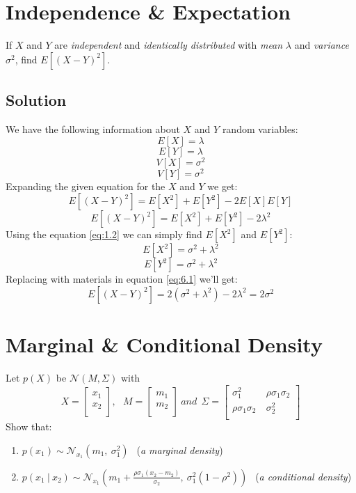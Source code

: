 \documentclass[12pt]{article}
\numberwithin{equation}{section}
\numberwithin{table}{section}
\numberwithin{figure}{section}
\begin{document}
\section{Independence \& Expectation}
If $X$ and $Y$ are \textit{independent} and \textit{identically distributed} with \textit{mean} $\lambda$ and \textit{variance} $\sigma^2$, find $E[(X-Y)^2]$.

\subsection*{Solution}
We have the following information about $X$ and $Y$ random variables:\\
$$
	E[X] = \lambda
$$
$$
	E[Y] = \lambda
$$
$$
	V[X] = \sigma^2
$$
$$
	V[Y] = \sigma^2
$$
Expanding the given equation for the $X$ and $Y$ we get:
$$
	E[(X-Y)^2] = E[X^2] + E[Y^2] - 2E[X]E[Y]
$$	
\begin{equation}\label{eq:6.1}
E[(X-Y)^2] = E[X^2] + E[Y^2] - 2\lambda^2
\end{equation}
Using the equation \ref{eq:1.2} we can simply find $E[X^2]$ and $E[Y^2]$:
$$
	E[X^2] = \sigma^2 + \lambda^2
$$
$$
	E[Y^2] = \sigma^2 + \lambda^2
$$
Replacing with materials in equation \ref{eq:6.1} we'll get:
$$
	\boxed{E[(X-Y)^2] = 2(\sigma^2 + \lambda^2)- 2\lambda^2 = 2\sigma^2}	
$$
\section{Marginal \& Conditional Density}
Let $p(X)$ be $\mathcal{N}(M, \Sigma)$ with
$$
	X = \begin{bmatrix}
	x_1\\	
	x_2\\
	\end{bmatrix},\ \ \ 
	M = \begin{bmatrix}
	m_1\\	
	m_2\\
	\end{bmatrix}\ and\ \ 
	\Sigma = \begin{bmatrix}
	\sigma_1^2 & \rho\sigma_1\sigma_2\\	
	\rho\sigma_1\sigma_2\ & \sigma_2^2\\
	\end{bmatrix}
$$
Show that:
\begin{enumerate}[label=(\alph*)]
	\item $p(x_1) \sim \mathcal{N}_{x_1}(m_1,\ \sigma_1^2)\ \ $  (\textit{a marginal density})
	\item $p(x_1\ |\ x_2) \sim \mathcal{N}_{x_1}(m_1 + \frac{\rho\sigma_1(x_2 - m_2)}{\sigma_2},\ \sigma_1^2(1-\rho^2))\ \ $ (\textit{a conditional density})
\end{enumerate}
\newpage
\end{document}
